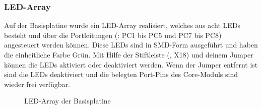 \subsubsection{LED-Array}
Auf der \gls{Basisplatine} wurde ein LED-Array realisiert, welches aus acht LEDs besteht und über die Portleitungen (: PC1 bis PC5 und PC7 bis PC8) angesteuert werden können. Diese LEDs sind in SMD-Form ausgeführt und haben die einheitliche Farbe Grün. Mit Hilfe der Stiftleiste (, X18) und deinem Jumper können die LEDs aktiviert oder deaktiviert werden. Wenn der Jumper entfernt ist sind die LEDs deaktiviert und die belegten Port-Pins des \gls{Core-Modul}s sind wieder frei verfügbar.

\begin{figure}[htb]
    \centering
    \qquad
    \qquad
    \caption[LED-Array der Basisplatine]{LED-Array der \gls{Basisplatine}}
    \label{fig:basisplatine-leds}
\end{figure}

